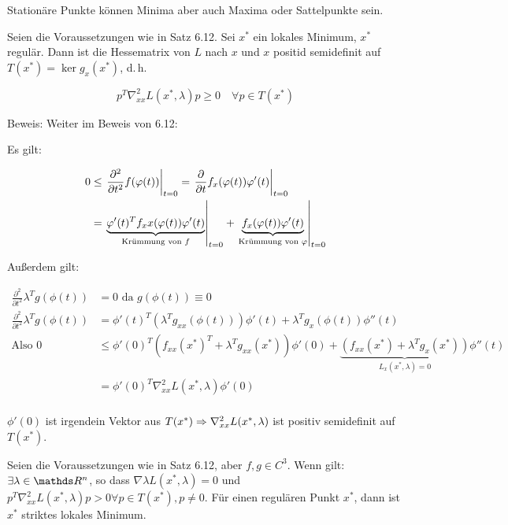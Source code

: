 
Stationäre Punkte können Minima aber auch Maxima oder Sattelpunkte sein.


Seien die Voraussetzungen wie in Satz 6.12. Sei $x^*$ ein lokales Minimum, $x^*$ regulär. Dann ist die Hessematrix von $L$ nach $x$ und $x$ positid semidefinit auf $T(x^*) = \ker g_x(x^*)$, d.\,h.

\[ p^T \nabla_{xx}^2 L(x^*, \lambda) p \geq 0 \quad \forall p \in T(x^*) \]

Beweis: Weiter im Beweis von 6.12:

Es gilt:

\begin{align*}
0 &\leq \left. \frac{\partial^2}{\partial t^2} f(\varphi(t)) \right|_{t=0} = \left. \frac{\partial}{\partial t} f_x(\varphi(t)) \varphi'(t) \right|_{t=0} \\
&= \left. \underbrace{ \varphi'(t)^T f_xx(\varphi(t)) \varphi'(t)}_{\text{Krümmung von } f} \right|_{t=0} + \left. \underbrace{f_x(\varphi(t)) \varphi'(t)}_{\text{Krümmung von } \varphi} \right|_{t=0} \\
\end{align*}

Außerdem gilt:

\begin{align*}
\frac{\partial^2}{\partial t^2} \lambda^T g(\phi(t)) &= 0 \text{ da } g(\phi(t)) \equiv 0 \\
\frac{\partial^2}{\partial t^2} \lambda^T g(\phi(t)) &= \phi'(t)^T (\lambda^T g_{xx} (\phi(t))) \phi'(t) + \lambda^T g_x(\phi(t)) \phi''(t) \\
\text{Also } 0 & \leq \phi'(0)^T (f_{xx} (x^*)^T + \lambda^T g_{xx}(x^*)) \phi'(0) + \underbrace{(f_{xx}(x^*) + \lambda^T g_x(x^*))}_{L_{x} (x^*, \lambda) = 0} \phi''(t) \\
&= \phi'(0)^T \nabla_{xx}^2 L(x^*, \lambda) \phi'(0) \\
\end{align*}

$\phi'(0)$ ist irgendein Vektor aus $T(x^*) \Rightarrow \nabla_{xx}^2 L(x^*, \lambda)$ ist positiv semidefinit auf $T(x^*)$.


Seien die Voraussetzungen wie in Satz 6.12, aber $f,g\in C^3$. Wenn gilt: $\exists \lambda \in \R^n$, so dass $\nabla \lambda L(x^*, \lambda) = 0$ und $p^T \nabla_{xx}^2 L(x^*, \lambda) p > 0 \forall p \in T(x^*), p \neq 0$. Für einen regulären Punkt $x^*$, dann ist $x^*$ striktes lokales Minimum.

